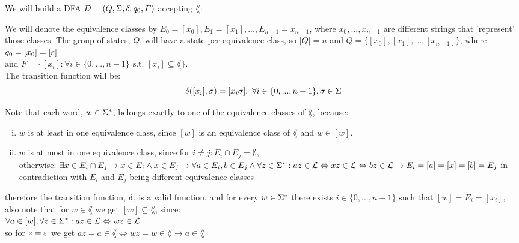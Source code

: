 We will build a DFA $D = (Q, \Sigma, \delta, q_0, F)$ accepting $\lang$:

We will denote the equivalence classes by $E_0=[x_0], E_1=[x_1], ... , E_{n-1}=x_{n-1}$,
where $x_0,...,x_{n-1}$ are different strings that 'represent' those classes.
The group of states, $Q$, will have a state per equivalence class, so $|Q|=n$
and $Q=\{[x_0],[x_1],...,[x_{n-1}]\}$, where $q_0=[x_0]=[\varepsilon]$ \\
and $F=\{[x_i] : \forall i \in \{0,...,n-1\} \text{ s.t. } [x_i] \subseteq \lang \}$. \\
The transition function will be:
\[
    \delta([x_i], \sigma) = [x_i \sigma], \text{ } \forall i \in \{0,...,n-1\}, \sigma \in \Sigma
\]

Note that each word, $w \in \Sigma^*$, belongs exactly to one of the equivalence classes of $\lang$, because:
\begin{enumerate}[i.]
    \item $w$ is at least in one equivalence class, since $[w]$ is an equivalence class of $\lang$ and $w \in [w]$.
    \item $w$ is at most in one equivalence class, since for $i \neq j: E_i \cap E_j = \emptyset$, \\
          otherwise: $\exists x \in  E_i \cap E_j \rightarrow x \in E_i \wedge x \in E_j \\
              \rightarrow \forall a \in E_i, b \in E_j \wedge \forall z \in \Sigma^*:
              az \in \mathcal{L} \Leftrightarrow xz \in \mathcal{L} \Leftrightarrow bz \in \mathcal{L} \\
              \rightarrow E_i = [a] = [x] = [b] = E_j$
          in contradiction with $E_i$ and $E_j$ being different equivalence classes
\end{enumerate}

therefore the transition function, $\delta$, is a valid function,
and for every $w \in \Sigma^*$ there exists $ i \in \{0,...,n-1\}$ such that $[w] = E_i = [x_i]$,
also note that for $w \in \lang$ we get $[w] \subseteq \lang$, since: \\
$\forall a \in [w], \forall z \in \Sigma^*: az \in \mathcal{L} \Leftrightarrow wz \in \mathcal{L}$ \\
so for $z=\varepsilon$ we get $az=a \in \lang \Leftrightarrow wz=w \in \lang \rightarrow a \in \lang$


